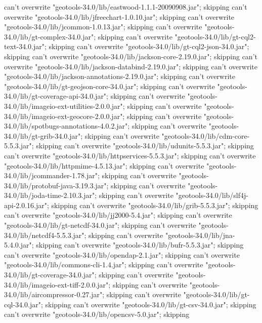    can't overwrite "geotools-34.0/lib/eastwood-1.1.1-20090908.jar"; skipping
    can't overwrite "geotools-34.0/lib/jfreechart-1.0.10.jar"; skipping
    can't overwrite "geotools-34.0/lib/jcommon-1.0.13.jar"; skipping
    can't overwrite "geotools-34.0/lib/gt-complex-34.0.jar"; skipping
    can't overwrite "geotools-34.0/lib/gt-cql2-text-34.0.jar"; skipping
    can't overwrite "geotools-34.0/lib/gt-cql2-json-34.0.jar"; skipping
    can't overwrite "geotools-34.0/lib/jackson-core-2.19.0.jar"; skipping
    can't overwrite "geotools-34.0/lib/jackson-databind-2.19.0.jar"; skipping
    can't overwrite "geotools-34.0/lib/jackson-annotations-2.19.0.jar"; skipping
    can't overwrite "geotools-34.0/lib/gt-geojson-core-34.0.jar"; skipping
    can't overwrite "geotools-34.0/lib/gt-coverage-api-34.0.jar"; skipping
    can't overwrite "geotools-34.0/lib/imageio-ext-utilities-2.0.0.jar"; skipping
    can't overwrite "geotools-34.0/lib/imageio-ext-geocore-2.0.0.jar"; skipping
    can't overwrite "geotools-34.0/lib/spotbugs-annotations-4.0.2.jar"; skipping
    can't overwrite "geotools-34.0/lib/gt-grib-34.0.jar"; skipping
    can't overwrite "geotools-34.0/lib/cdm-core-5.5.3.jar"; skipping
    can't overwrite "geotools-34.0/lib/udunits-5.5.3.jar"; skipping
    can't overwrite "geotools-34.0/lib/httpservices-5.5.3.jar"; skipping
    can't overwrite "geotools-34.0/lib/httpmime-4.5.13.jar"; skipping
    can't overwrite "geotools-34.0/lib/jcommander-1.78.jar"; skipping
    can't overwrite "geotools-34.0/lib/protobuf-java-3.19.3.jar"; skipping
    can't overwrite "geotools-34.0/lib/joda-time-2.10.3.jar"; skipping
    can't overwrite "geotools-34.0/lib/slf4j-api-2.0.16.jar"; skipping
    can't overwrite "geotools-34.0/lib/grib-5.5.3.jar"; skipping
    can't overwrite "geotools-34.0/lib/jj2000-5.4.jar"; skipping
    can't overwrite "geotools-34.0/lib/gt-netcdf-34.0.jar"; skipping
    can't overwrite "geotools-34.0/lib/netcdf4-5.5.3.jar"; skipping
    can't overwrite "geotools-34.0/lib/jna-5.4.0.jar"; skipping
    can't overwrite "geotools-34.0/lib/bufr-5.5.3.jar"; skipping
    can't overwrite "geotools-34.0/lib/opendap-2.1.jar"; skipping
    can't overwrite "geotools-34.0/lib/commons-cli-1.4.jar"; skipping
    can't overwrite "geotools-34.0/lib/gt-coverage-34.0.jar"; skipping
    can't overwrite "geotools-34.0/lib/imageio-ext-tiff-2.0.0.jar"; skipping
    can't overwrite "geotools-34.0/lib/aircompressor-0.27.jar"; skipping
    can't overwrite "geotools-34.0/lib/gt-cql-34.0.jar"; skipping
    can't overwrite "geotools-34.0/lib/gt-csv-34.0.jar"; skipping
    can't overwrite "geotools-34.0/lib/opencsv-5.0.jar"; skipping
